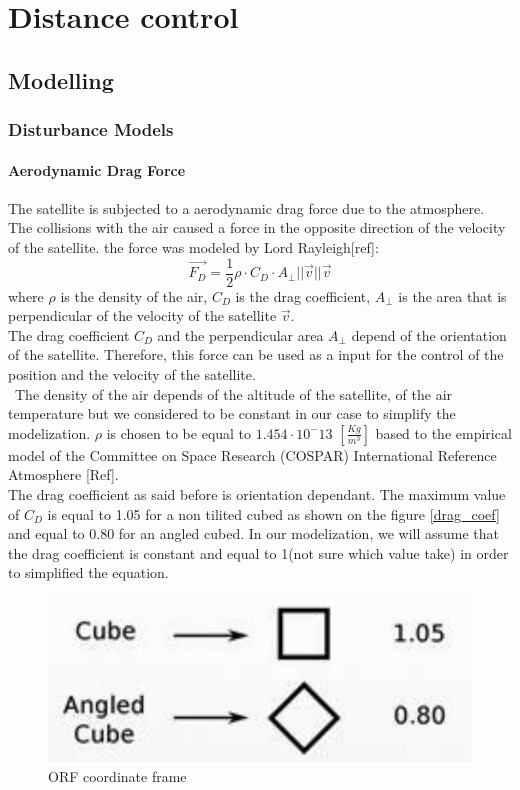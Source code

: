 \part{Distance control}
\chapter{Modelling}
\section{Disturbance Models}
\subsection{Aerodynamic Drag Force}
The satellite is subjected to a aerodynamic drag force due to the atmosphere. The collisions with the air caused a force in the opposite direction of the velocity of the satellite. the force was modeled by Lord Rayleigh[ref]:
\[
\vec{F_D} = \frac{1}{2} \rho \cdot C_D \cdot A_{\perp} ||\vec{v}|| \vec{v}
\]
where $\rho$ is the density of the air, $C_D$ is the drag coefficient, $A_{\perp}$ is the area that is perpendicular of the velocity of the satellite $\vec{v}$. \\
The drag coefficient $C_D$ and the perpendicular area $A_{\perp}$ depend of the orientation of the satellite. Therefore, this force can be used as a input for the control of the position and the velocity of the satellite. \\\
The density of the air depends of the altitude of the satellite, of the air temperature but we considered to be constant in our case to simplify the modelization. $\rho$ is chosen to be equal to $1.454 \cdot 10^-13$ $[\frac{Kg}{m^3}]$ based to the  empirical model of the Committee on Space Research (COSPAR) International Reference Atmosphere [Ref]. \\ %
The drag coefficient as said before is orientation dependant. The maximum value of $C_D$ is equal to 1.05 for a non tilited cubed as shown on the figure \ref{drag_coef} and equal to 0.80 for an angled cubed. In our modelization, we will assume that the drag coefficient is constant and equal to 1(not sure which value take) in order to simplified the equation. \\
\begin{figure}[H]
	\centering
	\includegraphics[width=0.4\linewidth]{figures/drag_coef}
	\caption{ORF coordinate frame}
	\label{fig:OFR}
\end{figure}

